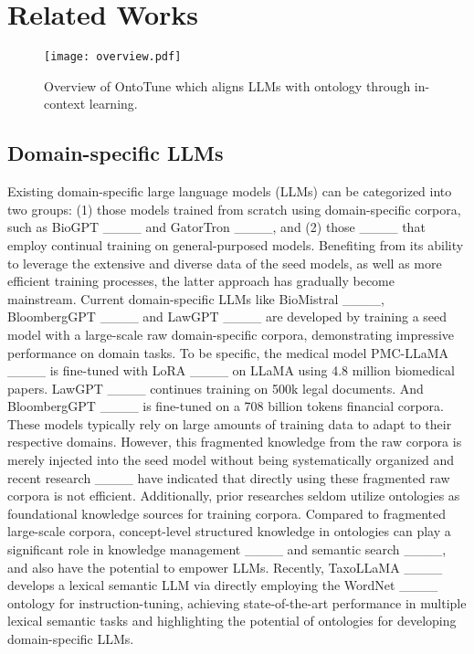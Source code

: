 \section{Related Works}

\begin{figure*}[ht]
\centering
\texttt{[image: overview.pdf]}
\vspace{-6mm}
\caption{Overview of OntoTune which aligns LLMs with ontology through in-context learning.}
\label{fig:method}
\end{figure*}

\subsection{Domain-specific LLMs}
Existing domain-specific large language models (LLMs) can be categorized into two groups: (1) those models trained from scratch using domain-specific corpora, such as BioGPT ____ and GatorTron ____, and (2) those ____ that employ continual training on general-purposed models. Benefiting from its ability to leverage the extensive and diverse data of the seed models, as well as more efficient training processes, the latter approach has gradually become mainstream. Current domain-specific LLMs like BioMistral ____, BloombergGPT ____ and LawGPT ____ are developed by training a seed model with a large-scale raw domain-specific corpora, demonstrating impressive performance on domain tasks. To be specific, the medical model PMC-LLaMA ____ is fine-tuned with LoRA ____  on LLaMA using 4.8 million biomedical papers. LawGPT ____  continues training on 500k legal documents. And BloombergGPT ____ is fine-tuned on a 708 billion tokens financial corpora. These models typically rely on large amounts of training data to adapt to their respective domains. However, this fragmented knowledge from the raw corpora is merely injected into the seed model without being systematically organized and recent research ____ have indicated that directly using these fragmented raw corpora is not efficient. Additionally, prior researches seldom utilize ontologies as foundational knowledge sources for training corpora. Compared to fragmented large-scale corpora, concept-level structured knowledge in ontologies can play a significant role in knowledge management ____ and semantic search ____, and also have the potential to empower LLMs. Recently, TaxoLLaMA ____ develops a lexical semantic LLM via directly employing the WordNet ____ ontology for instruction-tuning, achieving state-of-the-art performance in multiple lexical semantic tasks and highlighting the potential of ontologies for developing domain-specific LLMs.


